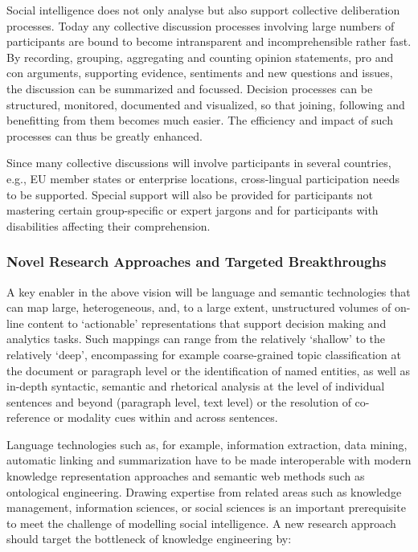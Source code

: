 \documentclass[10pt, plain]{../../metanetpaper}
\begin{document}
\begin{multicols}{2}
Social intelligence does not only analyse but also support collective deliberation processes. Today any collective discussion processes involving large numbers of participants are bound to become intransparent and incomprehensible rather fast. By recording, grouping, aggregating and counting opinion statements, pro and con arguments, supporting evidence, sentiments and new questions and issues, the discussion can be summarized and focussed. Decision processes can be structured, monitored, documented and visualized, so that joining, following and benefitting from them becomes much easier. The efficiency and impact of such processes can thus be greatly enhanced.
 
Since many collective discussions will involve participants in several countries, e.g., EU member states or enterprise locations, cross-lingual participation needs to be supported. Special support will also be provided for participants not mastering certain group-specific or expert jargons and for participants with disabilities affecting their comprehension.

\subsubsection{Novel Research Approaches and Targeted Breakthroughs}
\label{sec:novel-rese-appr-pt2}

A key enabler in the above vision will be language and semantic technologies that can map large, heterogeneous, and, to a large extent, unstructured volumes of on-line content to ‘actionable’ representations that support decision making and analytics tasks. Such mappings can range from the relatively ‘shallow’ to the relatively ‘deep’, encompassing for example coarse-grained topic classification at the document or paragraph level or the identification of named entities, as well as in-depth syntactic, semantic and rhetorical analysis at the level of individual sentences and beyond (paragraph level, text level) or the resolution of co-reference or modality cues within and across sentences.
 
Language technologies such as, for example, information extraction, data mining, automatic linking and summarization have to be made interoperable with modern knowledge representation approaches and semantic web methods such as ontological engineering. Drawing expertise from related areas such as knowledge management, information sciences, or social sciences is an important prerequisite to meet the challenge of modelling social intelligence. A new research approach should target the bottleneck of knowledge engineering by:


\end{multicols}
\end{document}
